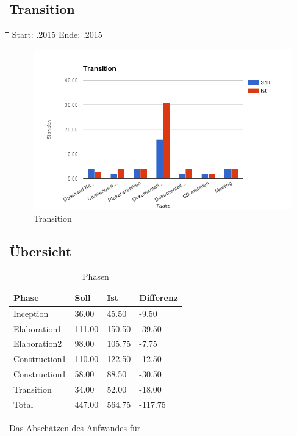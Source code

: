 \subsection{Transition}
\begin{tabbing}[H]
    \hspace*{3cm}\=\hspace*{5cm}\=\hspace*{3cm}\=\hspace*{3cm}\= \kill
    Start: .2015 \> Ende: .2015 \\
\end{tabbing}
\begin{figure}[H]
\centering
\includegraphics[width=390pt]{images/transition.png}
\caption[Transition]{Transition}
\end{figure}

\subsection{Übersicht}
\begin{table}[H]
\centering
    \begin{tabular}{|p{5cm}|p{2cm}|p{2cm}|p{2cm}|}
    \hline    
    \rowcolor{lightblue}
	Phase & Soll & Ist & Differenz \\ \hline
	Inception & 36.00 &	45.50 &	-9.50 \\ \hline
	Elaboration1 & 111.00 & 150.50	& -39.50 \\ \hline
	Elaboration2 & 98.00 & 105.75 & -7.75 \\ \hline
	Construction1 & 110.00 & 122.50 & -12.50 \\ \hline
	Construction1 & 58.00 & 88.50 & -30.50 \\ \hline
	Transition & 34.00 & 52.00 & -18.00 \\ \hline
	\rowcolor{lightblue}
	Total & 447.00 & 564.75 & -117.75 \\ \hline
    \end{tabular}
    \caption[Phasen]{Phasen}
\end{table}

Das Abschätzen des Aufwandes für 

\newpage